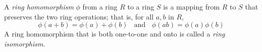 
\begin{definition}
	A \textit{ring homomorphism} $\phi$ from a ring $R$ to a ring $S$ is a mapping from $R$ to $S$ that preserves the two ring operations; that is, for all $a,b$ in $R$,
	\[ \phi(a + b) = \phi(a) + \phi(b)\ \ \ \ \text{and}\ \ \ \ \phi(ab) = \phi(a)\phi(b) \]
	A ring homomorphism that is both one-to-one and onto is called a \textit{ring isomorphism}.
\end{definition}
